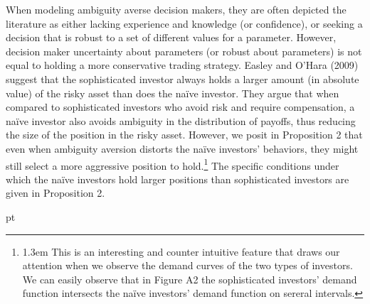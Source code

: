 \documentclass[10pt]{article}
\begin{document}
When modeling ambiguity averse decision makers, they are often depicted the literature as either lacking experience and knowledge (or confidence), or seeking a decision that is robust to a set of different values for a parameter. However, decision maker uncertainty about parameters (or robust about parameters) is not equal to holding a more conservative trading strategy. Easley and O'Hara (2009) suggest that the sophisticated investor always holds a larger amount (in absolute value) of the risky asset than does the na\"ive investor. They argue that when compared to sophisticated investors who avoid risk and require compensation, a na\"ive investor also avoids ambiguity in the distribution of payoffs, thus reducing the size of the position in the risky asset. However, we posit in Proposition 2 that even when ambiguity aversion distorts the na\"ive investors' behaviors, they might still select a more aggressive position to hold.\footnote{\baselineskip1.3em This is an interesting and counter intuitive feature that draws our attention when we observe the demand curves of the two types of investors. We can easily observe that in Figure A2 the sophisticated investors' demand function intersects the na\"ive investors' demand function on sereral intervals.} The specific conditions under which the na\"ive investors hold larger positions than sophisticated investors are given in Proposition 2.

 pt
\end{document}
